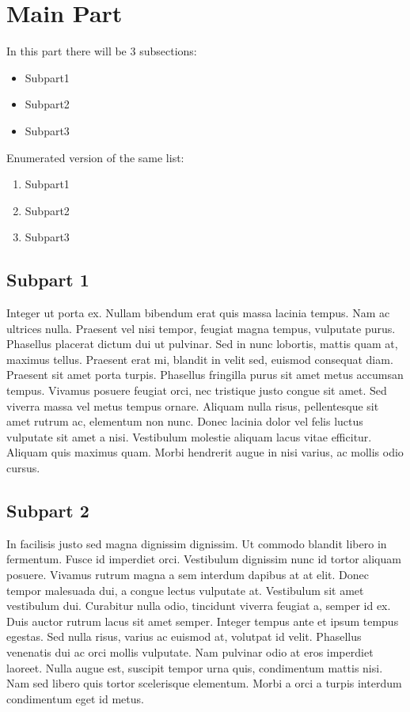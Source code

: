 \documentclass[10pt]{article}
\begin{document}
\section{Main Part}
In this part there will be 3 subsections:
\begin{itemize}
    \item Subpart1
    \item Subpart2
    \item Subpart3
\end{itemize}
Enumerated version of the same list:

\begin{enumerate}
    \item Subpart1
    \item Subpart2
    \item Subpart3
\end{enumerate}



\subsection{Subpart 1}
Integer ut porta ex. Nullam bibendum erat quis massa lacinia tempus. Nam ac ultrices nulla. Praesent vel nisi tempor, feugiat magna tempus, vulputate purus. Phasellus placerat dictum dui ut pulvinar. Sed in nunc lobortis, mattis quam at, maximus tellus. Praesent erat mi, blandit in velit sed, euismod consequat diam. Praesent sit amet porta turpis. Phasellus fringilla purus sit amet metus accumsan tempus. Vivamus posuere feugiat orci, nec tristique justo congue sit amet. Sed viverra massa vel metus tempus ornare. Aliquam nulla risus, pellentesque sit amet rutrum ac, elementum non nunc. Donec lacinia dolor vel felis luctus vulputate sit amet a nisi. Vestibulum molestie aliquam lacus vitae efficitur. Aliquam quis maximus quam. Morbi hendrerit augue in nisi varius, ac mollis odio cursus. 

\subsection{Subpart 2}
In facilisis justo sed magna dignissim dignissim. Ut commodo blandit libero in fermentum. Fusce id imperdiet orci. Vestibulum dignissim nunc id tortor aliquam posuere. Vivamus rutrum magna a sem interdum dapibus at at elit. Donec tempor malesuada dui, a congue lectus vulputate at. Vestibulum sit amet vestibulum dui. Curabitur nulla odio, tincidunt viverra feugiat a, semper id ex. Duis auctor rutrum lacus sit amet semper. Integer tempus ante et ipsum tempus egestas. Sed nulla risus, varius ac euismod at, volutpat id velit. Phasellus venenatis dui ac orci mollis vulputate. Nam pulvinar odio at eros imperdiet laoreet. Nulla augue est, suscipit tempor urna quis, condimentum mattis nisi. Nam sed libero quis tortor scelerisque elementum. Morbi a orci a turpis interdum condimentum eget id metus.
\end{document}
